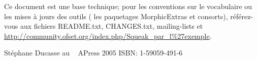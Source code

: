 \documentclass[a4paper,10pt,twoside]{book}
\begin{document}
Ce document est une base technique; pour les
conventions sur le vocabulaire ou les mises à jours des outils
(\parex{} les paquetages MorphicExtras et consorts), référez-vous aux fichiers README.txt,
CHANGES.txt, mailing-lists et
\url{http://community.ofset.org/index.php/Squeak_par_l\%27exemple}.

% 
%

%
%
\begin{thebibliography}{}

  {St\'ephane Ducasse}
  {au} {\bibatsep\  \apyformat
  {APress\bibbdsep {} 2005}  {ISBN: 1-59059-491-6} } {\bibhowcited}
    {}
  {} 

\end{thebibliography}

\end{document}
